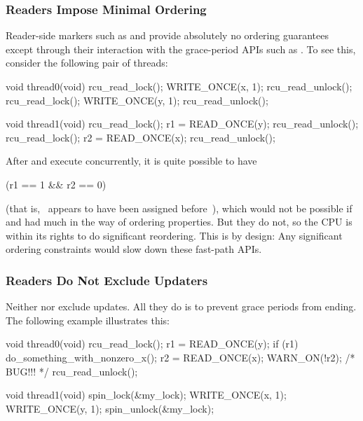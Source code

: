 \subsubsection{Readers Impose Minimal Ordering}

Reader-side markers such as  and
 provide absolutely no ordering guarantees except
through their interaction with the grace-period APIs such as
.
To see this, consider the following pair of
threads:

\begin{VerbatimN}
	void thread0(void)
	{
		rcu_read_lock();
		WRITE_ONCE(x, 1);
		rcu_read_unlock();
		rcu_read_lock();
		WRITE_ONCE(y, 1);
		rcu_read_unlock();
	}

	void thread1(void)
	{
		rcu_read_lock();
		r1 = READ_ONCE(y);
		rcu_read_unlock();
		rcu_read_lock();
		r2 = READ_ONCE(x);
		rcu_read_unlock();
	}
\end{VerbatimN}

After  and  execute concurrently, it is quite
possible to have

\begin{VerbatimU}
      (r1 == 1 && r2 == 0)
\end{VerbatimU}

\noindent%
(that is, ~appears to have been assigned before~), which would
not be possible if  and  had
much in the way of ordering properties.
But they do not, so the CPU is
within its rights to do significant reordering.
This is by design:
Any
significant ordering constraints would slow down these fast-path APIs.

\QuickQuizEnd


\subsubsection{Readers Do Not Exclude Updaters}

Neither  nor  exclude updates.
All they do is to prevent grace periods from ending. The following
example illustrates this:

\begin{VerbatimN}
	void thread0(void)
	{
		rcu_read_lock();
		r1 = READ_ONCE(y);
		if (r1) {
			do_something_with_nonzero_x();
			r2 = READ_ONCE(x);
			WARN_ON(!r2); /* BUG!!! */
		}
		rcu_read_unlock();
	}

	void thread1(void)
	{
		spin_lock(&my_lock);
		WRITE_ONCE(x, 1);
		WRITE_ONCE(y, 1);
		spin_unlock(&my_lock);
	}
\end{VerbatimN}

